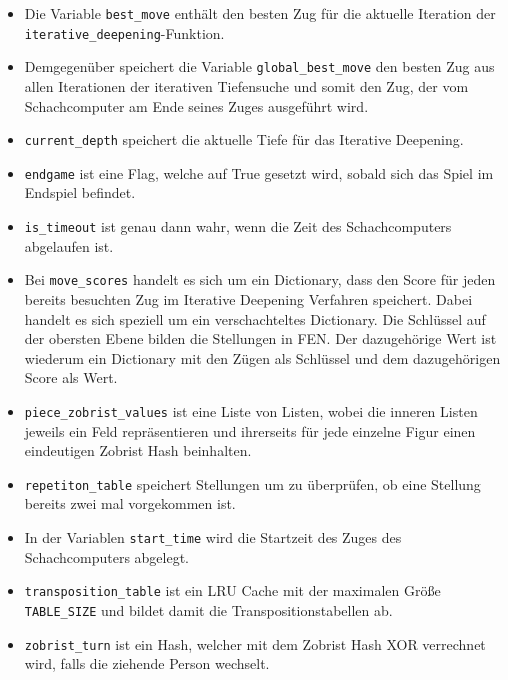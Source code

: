 \begin{itemize}
\tightlist
\item
  Die Variable \texttt{best\_move} enthält den besten Zug für die
  aktuelle Iteration der \texttt{iterative\_deepening}-Funktion.
\item
  Demgegenüber speichert die Variable \texttt{global\_best\_move} den
  besten Zug aus allen Iterationen der iterativen Tiefensuche und somit
  den Zug, der vom Schachcomputer am Ende seines Zuges ausgeführt wird.
\item
  \texttt{current\_depth} speichert die aktuelle Tiefe für das Iterative
  Deepening.
\item
  \texttt{endgame} ist eine Flag, welche auf True gesetzt wird, sobald
  sich das Spiel im Endspiel befindet.
\item
  \texttt{is\_timeout} ist genau dann wahr, wenn die Zeit des
  Schachcomputers abgelaufen ist.
\item
  Bei \texttt{move\_scores} handelt es sich um ein Dictionary, dass den
  Score für jeden bereits besuchten Zug im Iterative Deepening Verfahren
  speichert. Dabei handelt es sich speziell um ein verschachteltes
  Dictionary. Die Schlüssel auf der obersten Ebene bilden die Stellungen
  in \ac{FEN}. Der dazugehörige Wert ist wiederum
  ein Dictionary mit den Zügen als Schlüssel und dem dazugehörigen Score
  als Wert.
\item
  \texttt{piece\_zobrist\_values} ist eine Liste von Listen, wobei die
  inneren Listen jeweils ein Feld repräsentieren und ihrerseits für jede
  einzelne Figur einen eindeutigen Zobrist Hash beinhalten.
\item
  \texttt{repetiton\_table} speichert Stellungen um zu überprüfen, ob
  eine Stellung bereits zwei mal vorgekommen ist.
\item
  In der Variablen \texttt{start\_time} wird die Startzeit des Zuges des
  Schachcomputers abgelegt.
\item
  \texttt{transposition\_table} ist ein LRU Cache mit der maximalen
  Größe \texttt{TABLE\_SIZE} und bildet damit die Transpositionstabellen
  ab.
\item
  \texttt{zobrist\_turn} ist ein Hash, welcher mit dem Zobrist Hash XOR
  verrechnet wird, falls die ziehende Person wechselt.
\end{itemize}

\bigskip

